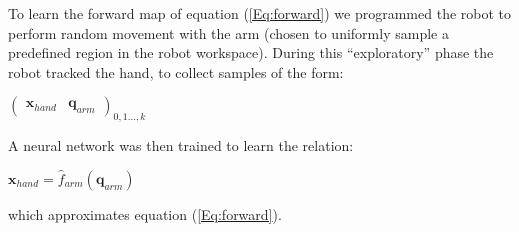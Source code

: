 To learn the forward map of equation (\ref{Eq:forward}) we programmed the robot 
to perform random movement with the arm (chosen to uniformly sample 
a predefined region in the robot workspace). During this ``exploratory'' phase the robot
tracked the hand, to collect samples of the form:
%
\begin{center}
\begin{math}
  \left(\begin{array}{cc}
    \mathbf x_{hand} & \mathbf q_{arm} \end{array}\right)_{0,1\dots,k}
\end{math}
\end{center}
%
A neural network was then trained to learn the relation:
%
\begin{center} 
\begin{math}
  \mathbf x_{hand}=\hat{f}_{arm}\left(\mathbf q_{arm}\right)
\end{math}
\end{center}
%
which approximates equation (\ref{Eq:forward}).



























